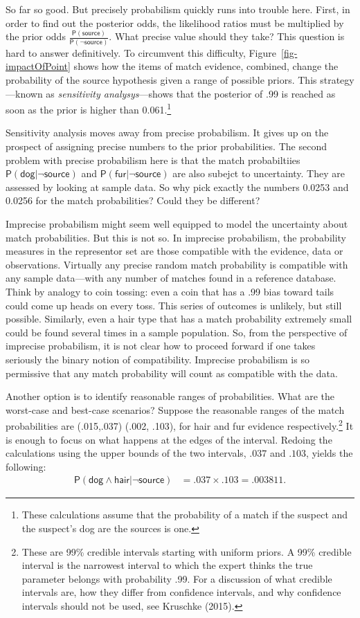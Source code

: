 \documentclass[
  letterpaper,
  DIV=11,
  numbers=noendperiod]{scrartcl}
\newcommand{\pr}[1]{\mathsf{P}(#1)}
\newcommand{\s}[1]{\mbox{$\mathsf{#1}$}}
\begin{document}
So far so good. But precisely probabilism quickly runs into trouble
here. First, in order to find out the posterior odds, the likelihood
ratios must be multiplied by the prior odds
\(\frac{\pr{\s{source}}}{\pr{\neg \s{source}}}\). What precise value
should they take? This question is hard to answer definitively. To
circumvent this difficulty, Figure~\ref{fig-impactOfPoint} shows how the
items of match evidence, combined, change the probability of the source
hypothesis given a range of possible priors. This strategy---known as
\emph{sensitivity analysys}---shows that the posterior of .99 is reached
as soon as the prior is higher than 0.061.\footnote{These calculations
  assume that the probability of a match if the suspect and the
  suspect's dog are the sources is one.}

Sensitivity analysis moves away from precise probabilism. It gives up on
the prospect of assigning precise numbers to the prior probabilities.
The second problem with precise probabilism here is that the match
probabiltiies \(\pr{\s{dog} \vert \neg \s{source}}\) and
\(\pr{\s{fur} \vert \neg \s{source}}\) are also subejct to uncertainty.
They are assessed by looking at sample data. So why pick exactly the
numbers 0.0253 and 0.0256 for the match probabilities? Could they be
different?

Imprecise probabilism might seem well equipped to model the uncertainty
about match probabilities. But this is not so. In imprecise probabilism,
the probability measures in the representor set are those compatible
with the evidence, data or observations. Virtually any precise random
match probability is compatible with any sample data---with any number
of matches found in a reference database. Think by analogy to coin
tossing: even a coin that has a .99 bias toward tails could come up
heads on every toss. This series of outcomes is unlikely, but still
possible. Similarly, even a hair type that has a match probability
extremely small could be found several times in a sample population. So,
from the perspective of imprecise probabilism, it is not clear how to
proceed forward if one takes seriously the binary notion of
compatibility. Imprecise probabilism is so permissive that any match
probability will count as compatible with the data.

Another option is to identify reasonable ranges of probabilities. What
are the worst-case and best-case scenarios? Suppose the reasonable
ranges of the match probabilities are (.015,.037) (.002, .103), for hair
and fur evidence respectively.\footnote{These are 99\% credible
  intervals starting with uniform priors. A 99\% credible interval is
  the narrowest interval to which the expert thinks the true parameter
  belongs with probability .99. For a discussion of what credible
  intervals are, how they differ from confidence intervals, and why
  confidence intervals should not be used, see Kruschke (2015).} It is
enough to focus on what happens at the edges of the interval. Redoing
the calculations using the upper bounds of the two intervals, \(.037\)
and \(.103\), yields the following: \begin{align*}
\mathsf{P}(\s{dog}\wedge \s{hair} \vert \neg \s{source})   & =  .037 \times .103 =.003811.
\end{align*}
\end{document}
